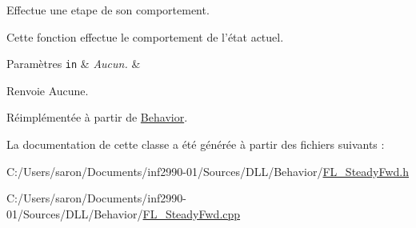 Effectue une etape de son comportement. 

Cette fonction effectue le comportement de l'état actuel.


\begin{DoxyParams}[1]{Paramètres}
\mbox{\tt in}  & {\em Aucun.} & \\
\hline
\end{DoxyParams}
\begin{DoxyReturn}{Renvoie}
Aucune. 
\end{DoxyReturn}


Réimplémentée à partir de \hyperlink{group__inf2990_gac22f205bc85075ff707ad1f695c18439}{Behavior}.



La documentation de cette classe a été générée à partir des fichiers suivants \-:\begin{DoxyCompactItemize}
\item 
C\-:/\-Users/saron/\-Documents/inf2990-\/01/\-Sources/\-D\-L\-L/\-Behavior/\hyperlink{_f_l___steady_fwd_8h}{F\-L\-\_\-\-Steady\-Fwd.\-h}\item 
C\-:/\-Users/saron/\-Documents/inf2990-\/01/\-Sources/\-D\-L\-L/\-Behavior/\hyperlink{_f_l___steady_fwd_8cpp}{F\-L\-\_\-\-Steady\-Fwd.\-cpp}\end{DoxyCompactItemize}
